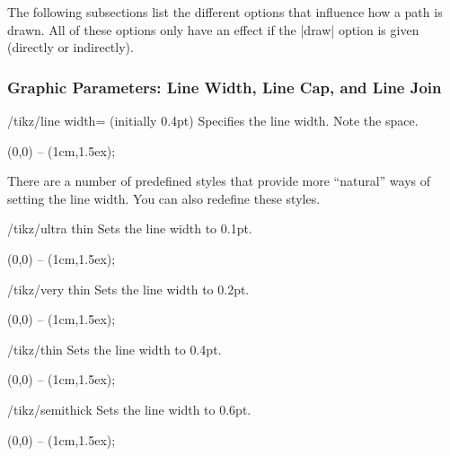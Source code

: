 The following subsections list the different options that influence how a path
is drawn. All of these options only have an effect if the |draw| option is
given (directly or indirectly).


\subsubsection{Graphic Parameters: Line Width, Line Cap, and Line Join}
\label{section-cap-joins}

\begin{key}{/tikz/line width= (initially 0.4pt)}
    Specifies the line width. Note the space.
\begin{codeexample}[]
  \tikz \draw[line width=5pt] (0,0) -- (1cm,1.5ex);
\end{codeexample}
\end{key}

There are a number of predefined styles that provide more ``natural'' ways of
setting the line width. You can also redefine these styles.

\begin{stylekey}{/tikz/ultra thin}
    Sets the line width to 0.1pt.
\begin{codeexample}[]
  \tikz {} (0,0) -- (1cm,1.5ex);
\end{codeexample}
\end{stylekey}

\begin{stylekey}{/tikz/very thin}
    Sets the line width to 0.2pt.
\begin{codeexample}[]
  \tikz {} (0,0) -- (1cm,1.5ex);
\end{codeexample}
\end{stylekey}

\begin{stylekey}{/tikz/thin}
    Sets the line width to 0.4pt.
\begin{codeexample}[]
  \tikz \draw[thin] (0,0) -- (1cm,1.5ex);
\end{codeexample}
\end{stylekey}

\begin{stylekey}{/tikz/semithick}
    Sets the line width to 0.6pt.
\begin{codeexample}[]
  \tikz \draw[semithick] (0,0) -- (1cm,1.5ex);
\end{codeexample}
\end{stylekey}

